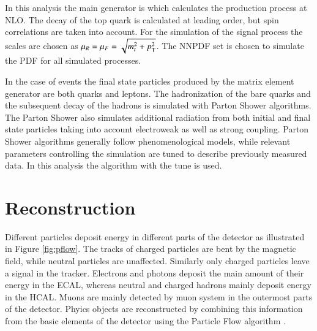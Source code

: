 In this analysis the main generator is  which calculates the production process at NLO. The decay of the top quark is calculated at leading order, but
spin correlations are taken into account. 
For the simulation of the \ttbar signal process the scales are chosen as $\mu_R = \mu_F = \sqrt{m_t^2 + p_{\mathrm{T}}^2}$.
The NNPDF set is chosen to simulate the PDF for all simulated processes. 

In the case of \ttbar events the final state particles produced by the matrix element generator are both quarks and leptons.
The hadronization of the bare quarks and the subsequent decay of the hadrons is simulated with Parton Shower algorithms. The Parton Shower also simulates additional radiation from both initial and final
state particles taking into account electroweak as well as strong coupling. Parton Shower algorithms generally follow phenomenological models, while relevant parameters controlling the simulation are tuned
to describe previously measured data. In this analysis the \PYTHIA algorithm with the  tune is used.








\section{Reconstruction}
\label{sec:SimReco_Reco}

Different particles deposit energy in different parts of the detector as illustrated in Figure \ref{fig:pflow}.
The tracks of charged particles are bent by the magnetic field, while neutral particles are unaffected.
Similarly only charged particles leave a signal in the tracker.
Electrons and photons deposit the main amount of their energy in the ECAL, whereas neutral and charged hadrons mainly deposit energy in the HCAL.
Muons are mainly detected by muon system in the outermost parts of the detector.
Phyics objects are reconstructed by combining this information from the basic elements of the detector using the Particle Flow algorithm \cite{Sirunyan:2017ulk}.

